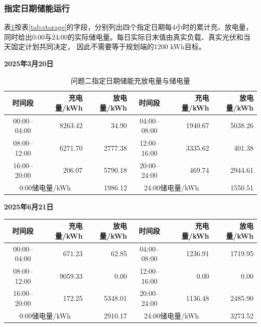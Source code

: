 \documentclass[UTF8,a4paper,12pt]{ctexart}
\begin{document}
\subsubsection{指定日期储能运行}
表\ref{tab:q2specified2}按表\ref{tab:storage}的字段，分别列出四个指定日期每4小时的累计充、放电量，
同时给出0:00与24:00的实际储电量。每日实际日末值由真实负载、真实光伏和当天固定计划共同决定，
因此不需要等于规划端的1200 kWh目标。

\begin{table}[H]
  \centering\small
  \setlength{\tabcolsep}{4.5pt}
  \renewcommand{\arraystretch}{0.94}
  \caption{问题二指定日期储能充放电量与储电量}\label{tab:q2specified2}

  \textbf{2025年3月20日}\\[2pt]
  \begin{tabular}{|c|r|r|c|r|r|}
    \hline
    时间段 & 充电量/kWh & 放电量/kWh & 时间段 & 充电量/kWh & 放电量/kWh\\
    \hline
    00:00--04:00 & 8263.42 & 34.90 & 04:00--08:00 & 1940.67 & 5038.26\\
    \hline
    08:00--12:00 & 6271.70 & 2777.38 & 12:00--16:00 & 3335.62 & 401.38\\
    \hline
    16:00--20:00 & 206.07 & 5790.18 & 20:00--24:00 & 469.74 & 2944.61\\
    \hline
    \multicolumn{2}{|c|}{0:00储电量/kWh} & 1986.12
      & \multicolumn{2}{c|}{24:00储电量/kWh} & 1550.51\\
    \hline
  \end{tabular}

\end{table}

\par\smallskip
\noindent\begin{minipage}{\textwidth}
  \centering\small
  \setlength{\tabcolsep}{4.5pt}
  \renewcommand{\arraystretch}{0.94}
  \textbf{2025年6月21日}\\[2pt]
  \begin{tabular}{|c|r|r|c|r|r|}
    \hline
    时间段 & 充电量/kWh & 放电量/kWh & 时间段 & 充电量/kWh & 放电量/kWh\\
    \hline
    00:00--04:00 & 671.23 & 62.85 & 04:00--08:00 & 1236.91 & 1719.95\\
    \hline
    08:00--12:00 & 9059.33 & 0.00 & 12:00--16:00 & 0.00 & 0.00\\
    \hline
    16:00--20:00 & 172.25 & 5348.01 & 20:00--24:00 & 1136.48 & 2485.90\\
    \hline
    \multicolumn{2}{|c|}{0:00储电量/kWh} & 2910.17
      & \multicolumn{2}{c|}{24:00储电量/kWh} & 3273.52\\
    \hline
  \end{tabular}

\end{minipage}
\end{document}
